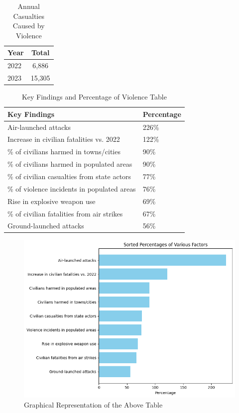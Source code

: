 \begin{table}[htbp!]
  \centering
  \caption{Annual Casualties Caused by Violence}
  \begin{tabular}{l|c}
    \hline
    Year & Total \\
    \hline
    2022 & 6,886 \\
    2023 & 15,305 \\
        \hline
    \end{tabular}
    \label{ann_casualties}
\end{table}


\begin{table}[htbp!]
  \centering
  \caption{Key Findings and Percentage of Violence Table}
  \begin{tabular}{|p{12cm}|p{3cm}|}
    \hline
    \textbf{Key Findings} &  \textbf{Percentage} \\
    \hline
    Air-launched attacks & 226\% \\
    \hline
    Increase in civilian fatalities vs. 2022 & 122\% \\
    \hline
    \% of civilians harmed in towns/cities & 90\% \\
    \hline
    \% of civilians harmed in populated areas & 90\% \\
    \hline
    \% of civilian casualties from state actors & 77\% \\
    \hline
    \% of violence incidents in populated areas & 76\% \\
    \hline
    Rise in explosive weapon use & 69\% \\
    \hline
    \% of civilian fatalities from air strikes & 67\% \\
    \hline
    Ground-launched attacks & 56\% \\
    \hline
  \end{tabular}
  \label{AOAV}
\end{table}

\begin{figure}[!htbp]
    \centering
    \includegraphics[width=1\linewidth]{Images/violent_behaviors.png}
    \caption[Key Findings and Percentage of Violence Graph]{Graphical Representation of the Above Table}
    \label{AOAVfig}
\end{figure}

